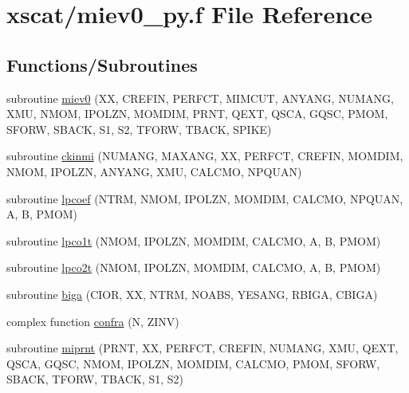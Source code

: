 \hypertarget{miev0__py_8f}{}\section{xscat/miev0\+\_\+py.f File Reference}
\label{miev0__py_8f}
\subsection*{Functions/\+Subroutines}
\begin{DoxyCompactItemize}
\item 
subroutine \hyperlink{miev0__py_8f_a48092e733ab76cc9db0501ed3b28d9ff}{miev0} (XX, C\+R\+E\+F\+IN, P\+E\+R\+F\+CT, M\+I\+M\+C\+UT, A\+N\+Y\+A\+NG, N\+U\+M\+A\+NG, X\+MU, N\+M\+OM, I\+P\+O\+L\+ZN, M\+O\+M\+D\+IM, P\+R\+NT, Q\+E\+XT, Q\+S\+CA, G\+Q\+SC, P\+M\+OM, S\+F\+O\+RW, S\+B\+A\+CK, S1, S2, T\+F\+O\+RW, T\+B\+A\+CK, S\+P\+I\+KE)
\item 
subroutine \hyperlink{miev0__py_8f_aeb0cfc95aa7e21e9ada7c4cb634d6c92}{ckinmi} (N\+U\+M\+A\+NG, M\+A\+X\+A\+NG, XX, P\+E\+R\+F\+CT, C\+R\+E\+F\+IN, M\+O\+M\+D\+IM, N\+M\+OM, I\+P\+O\+L\+ZN, A\+N\+Y\+A\+NG, X\+MU, C\+A\+L\+C\+MO, N\+P\+Q\+U\+AN)
\item 
subroutine \hyperlink{miev0__py_8f_a8f1c192fc6a73a6b9e55d5a52de1f201}{lpcoef} (N\+T\+RM, N\+M\+OM, I\+P\+O\+L\+ZN, M\+O\+M\+D\+IM, C\+A\+L\+C\+MO, N\+P\+Q\+U\+AN, A, B, P\+M\+OM)
\item 
subroutine \hyperlink{miev0__py_8f_a6fcb83505689f74c82cf122a250675b6}{lpco1t} (N\+M\+OM, I\+P\+O\+L\+ZN, M\+O\+M\+D\+IM, C\+A\+L\+C\+MO, A, B, P\+M\+OM)
\item 
subroutine \hyperlink{miev0__py_8f_af491bde683b4a07ee245f9c3e53c6894}{lpco2t} (N\+M\+OM, I\+P\+O\+L\+ZN, M\+O\+M\+D\+IM, C\+A\+L\+C\+MO, A, B, P\+M\+OM)
\item 
subroutine \hyperlink{miev0__py_8f_affcbe26d3e8beb59e07c207f2b0da43a}{biga} (C\+I\+OR, XX, N\+T\+RM, N\+O\+A\+BS, Y\+E\+S\+A\+NG, R\+B\+I\+GA, C\+B\+I\+GA)
\item 
complex function \hyperlink{miev0__py_8f_ad91aace4d77229d367c28c78965a0bd5}{confra} (N, Z\+I\+NV)
\item 
subroutine \hyperlink{miev0__py_8f_ac887bd1b637c8d2b27df19d1163aad55}{miprnt} (P\+R\+NT, XX, P\+E\+R\+F\+CT, C\+R\+E\+F\+IN, N\+U\+M\+A\+NG, X\+MU, Q\+E\+XT, Q\+S\+CA, G\+Q\+SC, N\+M\+OM, I\+P\+O\+L\+ZN, M\+O\+M\+D\+IM, C\+A\+L\+C\+MO, P\+M\+OM, S\+F\+O\+RW, S\+B\+A\+CK, T\+F\+O\+RW, T\+B\+A\+CK, S1, S2)
\item 

\end{DoxyCompactItemize}
